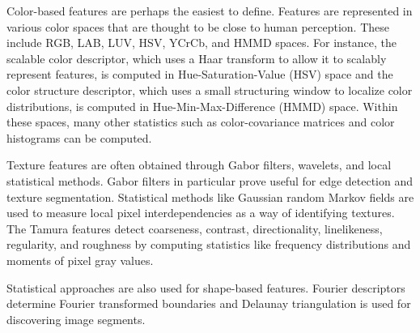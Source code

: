 Color-based features are perhaps the easiest to define. Features are represented in various color spaces that are thought to be close to human perception. These include RGB, LAB, LUV, HSV, YCrCb, and HMMD spaces. For instance, the scalable color descriptor, which uses a Haar transform to allow it to scalably represent features, is computed in Hue-Saturation-Value (HSV) space and the color structure descriptor, which uses a small structuring window to localize color distributions, is computed in Hue-Min-Max-Difference (HMMD) space. Within these spaces, many other statistics such as color-covariance matrices and color histograms can be computed. 

Texture features are often obtained through Gabor filters, wavelets, and local statistical methods. Gabor filters in particular prove useful for edge detection and texture segmentation.\cite{weldon1996efficient}\cite{mehrotra1992gabor} Statistical methods like Gaussian random Markov fields are used to measure local pixel interdependencies as a way of identifying textures.\cite{porter1997robust} The Tamura features detect coarseness, contrast, directionality, linelikeness, regularity, and roughness by computing statistics like frequency distributions and moments of pixel gray values.\cite{tamura1978textural}

Statistical approaches are also used for shape-based features. Fourier descriptors determine Fourier transformed boundaries and Delaunay triangulation is used for discovering image segments.

